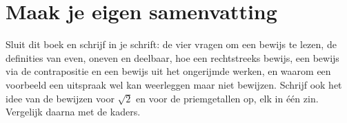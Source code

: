 \begin{oefeningen}






\end{oefeningen}


\ifzelfstudie
\section*{Maak je eigen samenvatting}
Sluit dit boek en schrijf in je schrift: de vier vragen om een bewijs te lezen, de definities van even, oneven en deelbaar, hoe een rechtstreeks bewijs, een bewijs via de contrapositie en een bewijs uit het ongerijmde werken, en waarom een voorbeeld een uitspraak wel kan weerleggen maar niet bewijzen. Schrijf ook het idee van de bewijzen voor $\sqrt2$ en voor de priemgetallen op, elk in één zin. Vergelijk daarna met de kaders.
\fi
